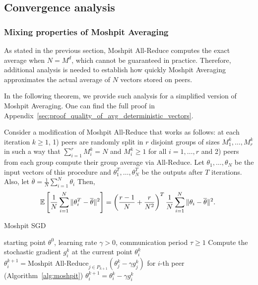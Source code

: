\vspace{-2pt}
\subsection{Convergence analysis}\label{sect:method_convergence}
\subsubsection{Mixing properties of Moshpit Averaging}\label{sect:theory_about_avg}
As stated in the previous section, Moshpit All-Reduce computes the exact average when $N = M^d$, which cannot be guaranteed in practice. Therefore, additional analysis is needed to establish how quickly Moshpit Averaging approximates the actual average of $N$ vectors stored on peers.

In the following theorem, we provide such analysis for a simplified version of Moshpit Averaging. One can find the full proof in Appendix~\ref{sec:proof_quality_of_avg_deterministic_vectors}.
\begin{theorem}\label{thm:quality_of_avg_deterministic_vectors}
    Consider a modification of Moshpit All-Reduce that works as follows: at each iteration $k\ge 1$, 1) peers are randomly split in $r$ disjoint groups of sizes $M_1^k,\ldots, M_r^k$ in such a way that $\sum_{i=1}^r M_i^k = N$ and $M_i^k \ge 1$ for all $i = 1,\ldots,r$ and 2) peers from each group compute their group average via All-Reduce. Let $\theta_1,\ldots,\theta_N$ be the input vectors of this procedure and $\theta_1^T,\ldots,\theta_N^T$ be the outputs after $T$ iterations. Also, let $\overline{\theta} = \frac{1}{N}\sum_{i=1}^N\theta_i$ Then,
    \begin{equation}
         \hspace{-0.1cm}\EE\left[\frac{1}{N}\sum\limits_{i=1}^N\|\theta_i^T - \overline{\theta}\|^2\right]= \left(\frac{r-1}{N} + \frac{r}{N^2}\right)^T\frac{1}{N}\sum\limits_{i=1}^N\|\theta_i - \overline{\theta}\|^2. \label{eq:determ_quality_of_avg}
    \end{equation}
\end{theorem}

\begin{algorithm}[h]
   \caption{Moshpit SGD}
   \label{alg:moshpit_local_sgd}
\begin{algorithmic}[1]
    starting point $\theta^0$, learning rate $\gamma > 0$, communication period $\tau \ge 1$
   \STATE Compute the stochastic gradient $g_i^k$ at the current point $\theta_i^k$
   \STATE $\theta_i^{k+1} = \text{Moshpit All-Reduce}_{j\in P_{k+1}}(\theta_j^k - \gamma g_j^k)$ for $i$-th peer (Algorithm~\ref{alg:moshpit})
   \ELSE
   \STATE $\theta_i^{k+1} = \theta_i^k - \gamma g_i^k$
   \ENDIF
   \ENDFOR
   \ENDFOR
\end{algorithmic}
\end{algorithm}\setlength{\textfloatsep}{12pt}

